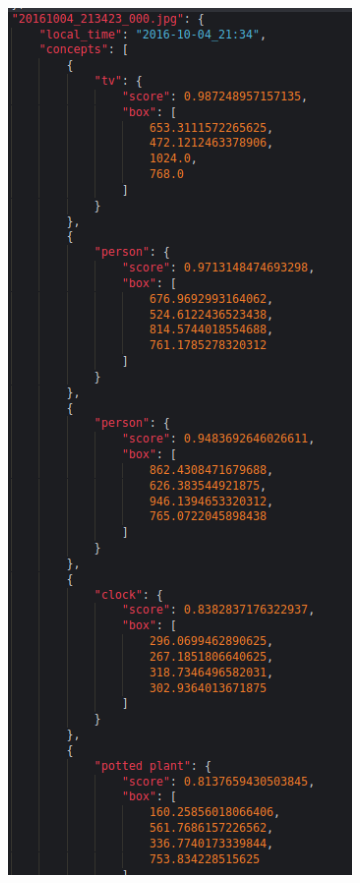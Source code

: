     \begin{figure}[H]
      \centering
      \captionsetup{justification=centering}
  
      \begin{subfigure}{0.3\textwidth}
      
      \includegraphics[width=\textwidth]{Sections/4InitialWork/4_images_random/res1.png} 

\end{subfigure}
\end{figure}
